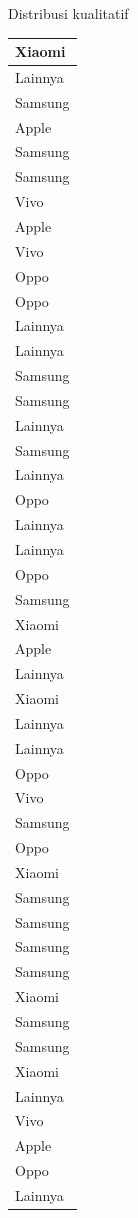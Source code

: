 \documentclass[
  ignorenonframetext,
]{beamer}
\begin{document}
\begin{frame}[s]{Distribusi kualitatif}
\begin{table}
\begin{tabular}[t]{l}
\hline
Xiaomi\\
\hline
Lainnya\\
\hline
Samsung\\
\hline
Apple\\
\hline
Samsung\\
\hline
Samsung\\
\hline
Vivo\\
\hline
Apple\\
\hline
Vivo\\
\hline
Oppo\\
\hline
Oppo\\
\hline
Lainnya\\
\hline
Lainnya\\
\hline
Samsung\\
\hline
Samsung\\
\hline
Lainnya\\
\hline
Samsung\\
\hline
Lainnya\\
\hline
Oppo\\
\hline
Lainnya\\
\hline
Lainnya\\
\hline
Oppo\\
\hline
Samsung\\
\hline
Xiaomi\\
\hline
Apple\\
\hline
Lainnya\\
\hline
Xiaomi\\
\hline
Lainnya\\
\hline
Lainnya\\
\hline
Oppo\\
\hline
Vivo\\
\hline
Samsung\\
\hline
Oppo\\
\hline
Xiaomi\\
\hline
Samsung\\
\hline
Samsung\\
\hline
Samsung\\
\hline
Samsung\\
\hline
Xiaomi\\
\hline
Samsung\\
\hline
Samsung\\
\hline
Xiaomi\\
\hline
Lainnya\\
\hline
Vivo\\
\hline
Apple\\
\hline
Oppo\\
\hline
Lainnya\\

\end{tabular}
\end{table}
\end{frame}
\end{document}
